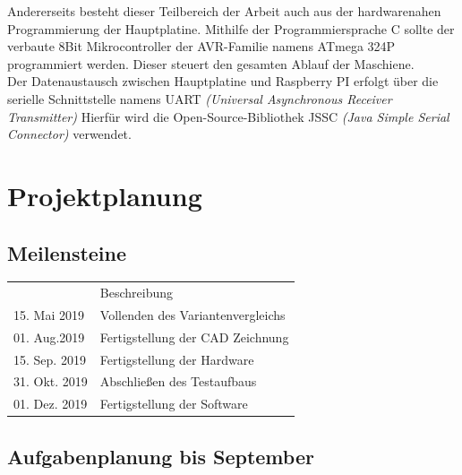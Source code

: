 Andererseits besteht dieser Teilbereich der Arbeit auch aus der hardwarenahen Programmierung der Hauptplatine. Mithilfe der Programmiersprache C sollte der verbaute 8Bit Mikrocontroller der AVR-Familie namens ATmega 324P programmiert werden.
Dieser steuert den gesamten Ablauf der Maschiene. \\

Der Datenaustausch zwischen Hauptplatine und Raspberry PI erfolgt über die serielle Schnittstelle namens UART
{\itshape (Universal Asynchronous Receiver Transmitter)}
Hierfür wird die Open-Source-Bibliothek JSSC
{\itshape (Java Simple Serial Connector)}  verwendet.
\chapter{Projektplanung}
\label{sec:Projektplanung}
\section{Meilensteine}
\begin{table}[h!]
    \begin{tabular}{ll}
        \hline
        \rowcolor[HTML]{C0C0C0}
        \multicolumn{2}{c}{\cellcolor[HTML]{C0C0C0}\textbf{Meilensteine}}                      \\ \hline
        \rowcolor[HTML]{EFEFEF}
        \multicolumn{1}{l|}{\cellcolor[HTML]{EFEFEF}Datum} & Beschreibung                      \\ \hline
        \multicolumn{1}{l|}{15. Mai 2019}                   & Vollenden des Variantenvergleichs \\ \hline
        \multicolumn{1}{l|}{01. Aug.2019}                    & Fertigstellung der CAD Zeichnung  \\ \hline
        \multicolumn{1}{l|}{15. Sep. 2019}                   & Fertigstellung der Hardware       \\ \hline
        \multicolumn{1}{l|}{31. Okt. 2019}                   & Abschließen des Testaufbaus       \\ \hline
        \multicolumn{1}{l|}{01. Dez. 2019}                    & Fertigstellung der Software       \\ \hline
    \end{tabular}
\end{table}

\section{Aufgabenplanung bis September}

